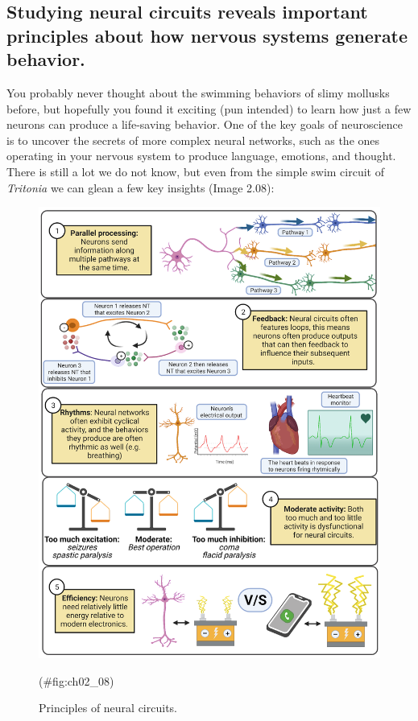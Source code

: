 \documentclass[
]{book}
\begin{document}
\hypertarget{studying-neural-circuits-reveals-important-principles-about-how-nervous-systems-generate-behavior.}{%
\subsection{Studying neural circuits reveals important principles about how nervous systems generate behavior.}\label{studying-neural-circuits-reveals-important-principles-about-how-nervous-systems-generate-behavior.}}

You probably never thought about the swimming behaviors of slimy mollusks before, but hopefully you found it exciting (pun intended) to learn how just a few neurons can produce a life-saving behavior. One of the key goals of neuroscience is to uncover the secrets of more complex neural networks, such as the ones operating in your nervous system to produce language, emotions, and thought. There is still a lot we do not know, but even from the simple swim circuit of \emph{Tritonia} we can glean a few key insights (Image 2.08):

\begin{figure}

{\centering \includegraphics[width=0.8\linewidth]{images/ch02/02_08} 

}

\caption{Principles of neural circuits.}(\#fig:ch02_08)
\end{figure}
\end{document}
